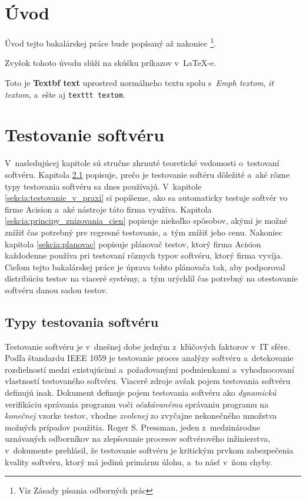 

%
%
\chapter{Úvod}
Úvod tejto bakalárskej práce bude popísaný až nakoniec \footnote{Viz Zásady písania odborných prác}.

Zvyšok tohoto úvodu slúži na skúšku príkazov v~\LaTeX-e.

Toto je \textbf{Textbf text} uprostred normálneho textu spolu s~\emph{Emph textom}, {\it it textom}, a~ešte aj \texttt{texttt textom}.



%
%
\chapter{Testovanie softvéru}

V~nasledujúcej kapitole sú stručne zhrnuté teoretické vedomosti o~testovaní softvéru.
Kapitola \ref{sekcia:typy_testovania} popisuje, prečo je testovanie softéru dôležité a~aké rôzne typy
testovania softvéru sa dnes používajú.
V~kapitole \ref{sekcia:testovanie_v_praxi} si popíšeme, ako sa automaticky testuje softvér vo firme Acision a~aké nástroje táto firma využíva.
Kapitola \ref{sekcia:principy_znizovania_cien} popisuje niekoľko spôsobov, akými je možné znížiť 
čas potrebný pre regresné testovanie, a~tým znížiť jeho cenu. 
Nakoniec kapitola \ref{sekcia:planovac} popisuje plánovač testov, ktorý firma Acision každodenne používa 
pri testovaní rôznych typov softvéru, ktorý firma vyvíja. 
Cieľom tejto bakalárskej práce je úprava tohto plánovača tak, aby podporoval distribúciu testov na viaceré systémy,
a~tým urýchlil čas potrebný na otestovanie softvéru danou sadou testov. 

\section{Typy testovania softvéru} 
\label{sekcia:typy_testovania}
Testovanie softvéru je v~dnešnej dobe jedným z~kľúčových faktorov v~IT sfére.
Podľa štandardu IEEE 1059 \cite{Ieee} je testovanie proces analýzy softvéru a~detekovanie rozdielností medzi 
existujúcimi a~požadovanými podmienkami a~vyhodnocovaní vlastností testovaného softvéru.
Viaceré zdroje avšak pojem testovania softvéru definujú inak.
Dokument \cite{Swebok} definuje pojem testovania softvéru ako {\it dynamickú} verifikáciu správania programu voči {\it očakávanému} správaniu programu na {\it konečnej} vzorke
testov, vhodne {\it zvolenej} zo zvyčajne nekonečného množstva možných prípadov použitia.
Roger S. Pressman, jeden z~medzinárodne uznávaných odborníkov na zlepšovanie procesov softvérového inžinierstva, v~dokumente \cite{Pressman} prehlásil, 
že testovanie softvéru je kritickým prvkom zabezpečenia kvality softvéru, ktorý má jedinú primárnu úlohu, a~to násť v~ňom chyby.  


